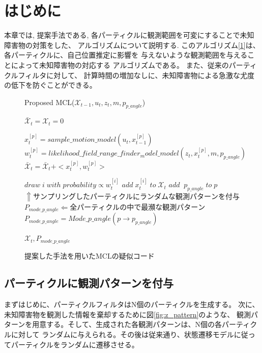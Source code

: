 \section{はじめに}
本章では, 提案手法である, 各パーティクルに観測範囲を可変にすることで未知障害物の対策をした、
アルゴリズムについて説明する. 
このアルゴリズム[\ref{alg:proposed_mcl}]は、各パーティクルに、自己位置推定に影響を
与えないような観測範囲を与えることによって未知障害物の対応する
アルゴリズムである。
また、従来のパーティクルフィルタに対して、
計算時間の増加なしに、未知障害物による急激な尤度の低下を防ぐことができる。

\begin{figure}[h]
  \begin{algorithm}[H]
      \caption{Proposed MCL($\mathcal{X}_{t-1}, u_t, z_t, m , p_{p\_angle}$)}
      \label{alg:proposed_mcl}
      \begin{algorithmic}
      \STATE $\mathcal{\bar{X}}_t = \mathcal{X}_t = 0$

      \STATE $x_{t}^{[p]} = sample\_motion\_model(u_{t}, x_{t-1}^{[p]})$
      \STATE $w_{t}^{[p]} = likelihood\_field\_range\_finder_model\_model(z_{t}, x_{t}^{[p]}, m, p_{p\_angle})$
      \STATE $\mathcal{\bar{X}}_t = \mathcal{\bar{X}}_t + <x_{t}^{[p]}, w_{t}^{[p]}>$
      \ENDFOR

      \STATE $draw\;i\;with\;probability \propto w_{t}^{[i]}$
      \STATE $add\; x_{t}^{[i]}\;to\;\mathcal{X}_t$
      \STATE $add\;\;p_{p\_angle}\;to\;p$
      \STATE $\Uparrow サンプリングしたパーティクルにランダムな観測パターンを付与$
      \ENDFOR
      \STATE $P_{mode\_p\_angle} \Leftarrow 全パーティクルの中で最瀕な観測パターン$
      \STATE $P_{mode\_p\_angle} = Mode\_p\_angle(p\rightarrow p_{p\_angle})$
      \ENDFOR
      
      \RETURN $\mathcal{X}_t, P_{mode\_p\_angle}$
      \end{algorithmic}
  \end{algorithm}
  \caption{提案した手法を用いたMCLの疑似コード}
\end{figure}

\subsection{パーティクルに観測パターンを付与}
まずはじめに、パーティクルフィルタはN個のパーティクルを生成する。
次に、未知障害物を観測した情報を棄却するために図\ref{fig:z_pattern}のような、
観測パターンを用意する。そして、生成された各観測パターンは、N個の各パーティクルに対して
ランダムに与えられる。その後は従来通り、状態遷移モデルに従ってパーティクルをランダムに遷移させる。



